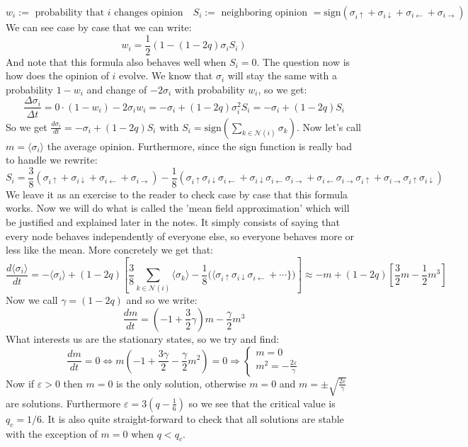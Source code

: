 \documentclass[10pt,a4paper]{book}
\begin{document}
\[
w_i := \text{ probability that } i \text{ changes opinion} \quad S_i := \text{ neighboring opinion } = \text{sign}(\sigma_{i\uparrow} + \sigma_{i\downarrow} + \sigma_{i\leftarrow} + \sigma_{i\rightarrow})
\]
We can see case by case that we can write:
\[
w_i = \frac{1}{2}(1 - (1 - 2q)\sigma_i S_i)
\]
And note that this formula also behaves well when $S_i = 0$. The question now is how does the opinion of $i$ evolve. We know that $\sigma_i$ will stay the same with a probability $1 - w_i$ and change of $-2\sigma_i$ with probability $w_i$, so we get:
\[
\frac{\Delta \sigma_i}{\Delta t} = 0\cdot(1 - w_i) - 2\sigma_i w_i = -\sigma_i + (1 - 2q)\sigma_i^2 S_i = -\sigma_i + (1 - 2q)S_i
\]
So we get $\frac{d\sigma_i}{dt} = -\sigma_i + (1 - 2q)S_i$  with $S_i = \text{sign}\left(\sum_{k \in \mathcal{N}(i)} \sigma_k\right)$. Now let's call $m = \langle \sigma_i \rangle$ the average opinion. Furthermore, since the sign function is really bad to handle we rewrite:
\[
S_i = \frac{3}{8}(\sigma_{i\uparrow} + \sigma_{i\downarrow} + \sigma_{i\leftarrow} + \sigma_{i\rightarrow}) - \frac{1}{8}(\sigma_{i\uparrow}\sigma_{i\downarrow}\sigma_{i\leftarrow} + \sigma_{i\downarrow}\sigma_{i\leftarrow}\sigma_{i\rightarrow} + \sigma_{i\leftarrow}\sigma_{i\rightarrow}\sigma_{i\uparrow} + \sigma_{i\rightarrow}\sigma_{i\uparrow}\sigma_{i\downarrow})
\]
We leave it as an exercise to the reader to check case by case that this formula works. Now we will do what is called the 'mean field approximation' which will be justified and explained later in the notes. It simply consists of saying that every node behaves independently of everyone else, so everyone behaves more or less like the mean. More concretely we get that:
\[
\frac{d\langle \sigma_i\rangle}{dt} = -\langle \sigma_i \rangle + (1-2q)\left[ \frac{3}{8}\sum_{k \in \mathcal{N}(i)} \langle \sigma_k \rangle - \frac{1}{8}\Big( \langle \sigma_{i\uparrow}\sigma_{i\downarrow}\sigma_{i\leftarrow} + \cdots \} \Big) \right] \approx - m + (1-2q)\left[ \frac{3}{2} m - \frac{1}{2}m^3 \right]
\]
Now we call $\gamma = (1 - 2q)$ and so we write:
\[
\frac{dm}{dt} = (-1 + \frac{3}{2}\gamma)m - \frac{\gamma}{2}m^3
\]
What interests us are the stationary states, so we try and find:
\[
\frac{dm}{dt} = 0 \Leftrightarrow m(-1 + \frac{3\gamma}{2} - \frac{\gamma}{2}m^2) = 0 \Rightarrow \begin{cases}
m = 0\\
m^2 = - \frac{2\varepsilon}{\gamma}
\end{cases}
\]
Now if $\varepsilon > 0$ then $m = 0$ is the only solution, otherwise $m = 0$ and $m = \pm \sqrt{\frac{2\varepsilon}{\gamma}}$ are solutions. Furthermore $\varepsilon = 3(q - \frac{1}{6})$ so we see that the critical value is $q_c = 1/6$. It is also quite straight-forward to check that all solutions are stable with the exception of $m = 0$ when $q < q_c$.
\end{document}
